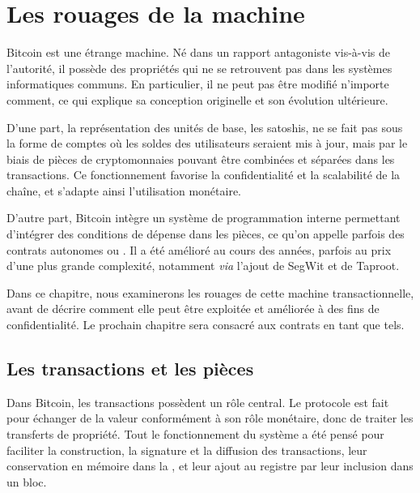 
\chapter{Les rouages de la machine}
\label{ch:rouages}

Bitcoin est une étrange machine. Né dans un rapport antagoniste vis-à-vis de l'autorité, il possède des propriétés qui ne se retrouvent pas dans les systèmes informatiques communs. En particulier, il ne peut pas être modifié n'importe comment, ce qui explique sa conception originelle et son évolution ultérieure.

D'une part, la représentation des unités de base, les satoshis, ne se fait pas sous la forme de comptes où les soldes des utilisateurs seraient mis à jour, mais par le biais de pièces de cryptomonnaies pouvant être combinées et séparées dans les transactions. Ce fonctionnement favorise la confidentialité et la scalabilité de la chaîne, et s'adapte ainsi l'utilisation monétaire.

D'autre part, Bitcoin intègre un système de programmation interne permettant d'intégrer des conditions de dépense dans les pièces, ce qu'on appelle parfois des contrats autonomes ou . Il a été amélioré au cours des années, parfois au prix d'une plus grande complexité, notamment \emph{via} l'ajout de SegWit et de Taproot.

Dans ce chapitre, nous examinerons les rouages de cette machine transactionnelle, avant de décrire comment elle peut être exploitée et améliorée à des fins de confidentialité. Le prochain chapitre sera consacré aux contrats en tant que tels.

\section*{Les transactions et les pièces} %

Dans Bitcoin, les transactions possèdent un rôle central. Le protocole est fait pour échanger de la valeur conformément à son rôle monétaire, donc de traiter les transferts de propriété. Tout le fonctionnement du système a été pensé pour faciliter la construction, la signature et la diffusion des transactions, leur conservation en mémoire dans la , et leur ajout au registre par leur inclusion dans un bloc.

